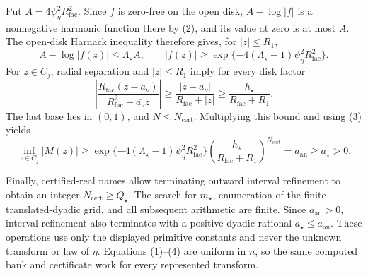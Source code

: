 Put \(A=4\psi_{\eta}^2R_{\mathrm{fac}}^2\).  Since \(f\) is zero-free on the open disk, \(A-\log|f|\) is a nonnegative harmonic function there by (2), and its value at zero is at most \(A\).  The open-disk Harnack inequality therefore gives, for \(|z|\le R_1\),
\[
 A-\log|f(z)|\le\Lambda_{\star}A,
 \qquad
 |f(z)|\ge
 \exp\{-4(\Lambda_{\star}-1)\psi_{\eta}^2R_{\mathrm{fac}}^2\}. \tag{3}
\]
For \(z\in C_j\), radial separation and \(|z|\le R_1\) imply for every disk factor
\[
 \left|
 \frac{R_{\mathrm{fac}}(z-a_\nu)}
      {R_{\mathrm{fac}}^2-\overline{a_\nu}z}
 \right|
 \ge \frac{|z-a_\nu|}{R_{\mathrm{fac}}+|z|}
 \ge \frac{h_{\star}}{R_{\mathrm{fac}}+R_1}.
\]
The last base lies in \((0,1)\), and \(N\le N_{\mathrm{cert}}\).  Multiplying this bound and using (3) yields
\[
 \inf_{z\in C_j}|M(z)|
 \ge
 \exp\{-4(\Lambda_{\star}-1)\psi_{\eta}^2R_{\mathrm{fac}}^2\}
 \left(\frac{h_{\star}}{R_{\mathrm{fac}}+R_1}\right)^{N_{\mathrm{cert}}}
 =a_{\mathrm{an}}
 \ge a_{\star}>0. \tag{4}
\]

Finally, certified-real names allow terminating outward interval refinement to obtain an integer \(N_{\mathrm{cert}}\ge Q_{\star}\).  The search for \(m_{\star}\), enumeration of the finite translated-dyadic grid, and all subsequent arithmetic are finite.  Since \(a_{\mathrm{an}}>0\), interval refinement also terminates with a positive dyadic rational \(a_{\star}\le a_{\mathrm{an}}\).  These operations use only the displayed primitive constants and never the unknown transform or law of \(\eta\).  Equations (1)--(4) are uniform in \(n\), so the same computed bank and certificate work for every represented transform.